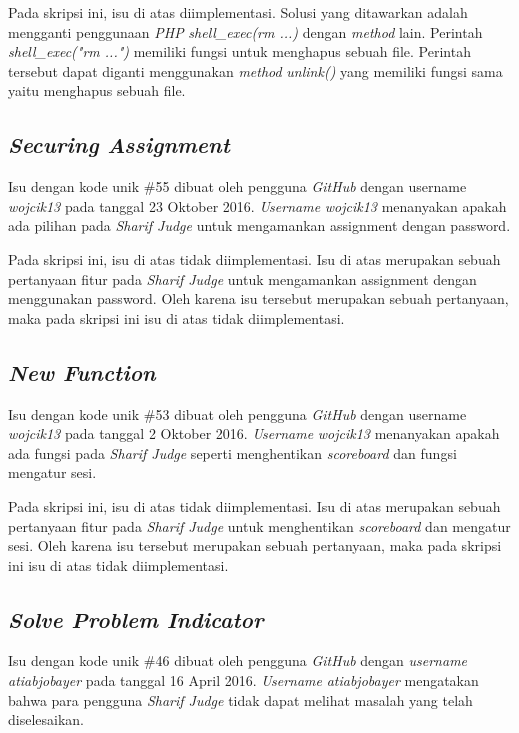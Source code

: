 Pada skripsi ini, isu di atas diimplementasi. Solusi yang ditawarkan adalah mengganti penggunaan \textit{PHP} \textit{shell\_exec(rm ...)} dengan \textit{method} lain.  Perintah \textit{shell\_exec("rm ...")} memiliki fungsi untuk menghapus sebuah file. Perintah tersebut dapat diganti menggunakan \textit{method} \textit{unlink()} yang memiliki fungsi sama yaitu menghapus sebuah file.

\subsection{\textit{Securing Assignment}}
Isu dengan kode unik \#55 dibuat oleh pengguna \textit{GitHub} dengan username \textit{wojcik13} pada tanggal 23 Oktober 2016. \textit{Username} \textit{wojcik13} menanyakan apakah ada pilihan pada \textit{Sharif Judge} untuk mengamankan assignment dengan password.

Pada skripsi ini, isu di atas tidak diimplementasi. Isu di atas merupakan sebuah pertanyaan fitur pada \textit{Sharif Judge} untuk mengamankan assignment dengan menggunakan password. Oleh karena isu tersebut merupakan sebuah pertanyaan, maka pada skripsi ini isu di atas tidak diimplementasi.

\subsection{\textit{New Function}}
Isu dengan kode unik \#53 dibuat oleh pengguna \textit{GitHub} dengan username \textit{wojcik13} pada tanggal 2 Oktober 2016. \textit{Username} \textit{wojcik13} menanyakan apakah ada fungsi pada \textit{Sharif Judge} seperti menghentikan \textit{scoreboard} dan fungsi mengatur sesi. 

Pada skripsi ini, isu di atas tidak diimplementasi. Isu di atas merupakan sebuah pertanyaan fitur pada \textit{Sharif Judge} untuk menghentikan \textit{scoreboard} dan mengatur sesi. Oleh karena isu tersebut merupakan sebuah pertanyaan, maka pada skripsi ini isu di atas tidak diimplementasi.

\subsection{\textit{Solve Problem Indicator}}
Isu dengan kode unik \#46 dibuat oleh pengguna \textit{GitHub} dengan \textit{username} \textit{atiabjobayer} pada tanggal 16 April 2016. \textit{Username} \textit{atiabjobayer} mengatakan bahwa para pengguna \textit{Sharif Judge} tidak dapat melihat masalah yang telah diselesaikan.

